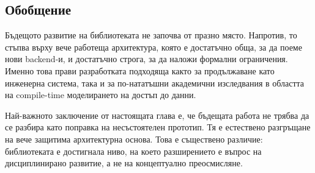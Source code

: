 \subsection{Обобщение}

Бъдещото развитие на библиотеката не започва от празно място. Напротив, то стъпва върху вече работеща архитектура, която е достатъчно обща, за да поеме нови backend-и, и достатъчно строга, за да наложи формални ограничения. Именно това прави разработката подходяща както за продължаване като инженерна система, така и за по-нататъшни академични изследвания в областта на compile-time моделирането на достъп до данни.

Най-важното заключение от настоящата глава е, че бъдещата работа не трябва да се разбира като поправка на несъстоятелен прототип. Тя е естествено разгръщане на вече защитима архитектурна основа. Това е съществено различие: библиотеката е достигнала ниво, на което разширението е въпрос на дисциплинирано развитие, а не на концептуално преосмисляне.

